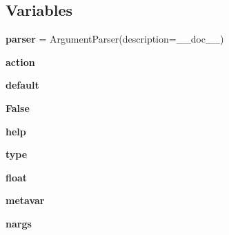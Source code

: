 \subsection*{Variables}
\begin{DoxyCompactItemize}
\item 
\mbox{\label{namespacepymavlink_1_1tools_1_1mavgpslag_abb0d882d3a0f5fc7846834c903d1f0d8}} 
{\bfseries parser} = Argument\+Parser(description=\+\_\+\+\_\+doc\+\_\+\+\_\+)
\item 
\mbox{\label{namespacepymavlink_1_1tools_1_1mavgpslag_a781ed3df690ef65f259d5a228f8c0e8c}} 
{\bfseries action}
\item 
\mbox{\label{namespacepymavlink_1_1tools_1_1mavgpslag_a4c27ec5b7da25f8ab0b5b3715485505d}} 
{\bfseries default}
\item 
\mbox{\label{namespacepymavlink_1_1tools_1_1mavgpslag_abb466409ddd003bb8b05c555b3547816}} 
{\bfseries False}
\item 
\mbox{\label{namespacepymavlink_1_1tools_1_1mavgpslag_a4b80249a372c47e275099e9081cda5cd}} 
{\bfseries help}
\item 
\mbox{\label{namespacepymavlink_1_1tools_1_1mavgpslag_a1ac3c1666aa73ae9d145485df40520f3}} 
{\bfseries type}
\item 
\mbox{\label{namespacepymavlink_1_1tools_1_1mavgpslag_ae1008ab86fe215c5b0af2b4d8f1013a0}} 
{\bfseries float}
\item 
\mbox{\label{namespacepymavlink_1_1tools_1_1mavgpslag_aaae38cb4a05fdc0d20f4d07c4c04d3d7}} 
{\bfseries metavar}
\item 
\mbox{\label{namespacepymavlink_1_1tools_1_1mavgpslag_a85b8bb2a28b64637a49cee3e19d5159d}} 
{\bfseries nargs}
\item 
\mbox{\label{namespacepymavlink_1_1tools_1_1mavgpslag_a211b75a871dce5e90cf7b21c93ce4478}} 

\end{DoxyCompactItemize}
